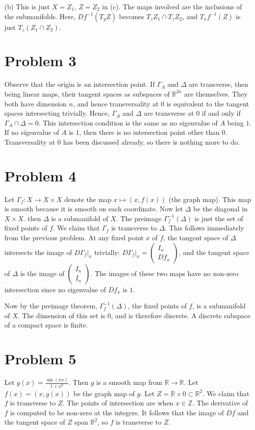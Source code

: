 \documentclass{amsart}
\numberwithin{equation}{section}
\theoremstyle{plain}
\theoremstyle{definition}
\theoremstyle{remark}
\newcommand{\Z}{\mathbb{Z}}
\renewcommand{\_}[2]{\underbrace{#1}_{#2}}
\renewcommand{\^}[2]{\overbrace{#1}_{#2}}
\newcommand{\R}{\mathbb{R}}
\begin{document}
 (b) This is just $X = Z_1$, $Z = Z_2$ in (c). The maps involved are the inclusions of the submanifolds. Here, $Df^{-1}(T_yZ)$ becomes $T_zZ_1 \cap T_zZ_2$, and $T_xf^{-1}(Z)$ is just $T_z(Z_1\cap Z_2)$. 
\section*{Problem 3}
Observe that the origin is an intersection point. If $\Gamma_A$ and $\Delta$ are transverse, then being linear maps, their tangent spaces as subspaces of $\R^{2n}$ are themselves. They both have dimension $n$, and hence transversality at $0$ is equivalent to the tangent spaces intersecting trivially. Hence, $\Gamma_A$ and $\Delta$ are transverse at $0$ if and only if $\Gamma_A \cap \Delta = 0$. This intersection condition is the same as no eigenvalue of $A$ being $1$. If no eigenvalue of $A$ is $1$, then there is no intersection point other than $0$. Transversality at $0$ has been discussed already, so there is nothing more to do.

\section*{Problem 4}
Let $\Gamma_f: X\to X\times X$ denote the map $x\mapsto (x,f(x))$ (the graph map). This map is smooth because it is smooth on each coordinate. Now let $\Delta$ be the diagonal in $X\times X$. then $\Delta$ is a submanifold of $X$. The preimage $\Gamma_f^{-1}(\Delta)$ is just the set of fixed points of $f$. We claim that $\Gamma_f$ is transverse to $\Delta$. This follows immediately from the previous problem. At any fixed point $x$ of $f$, the tangent space of $\Delta$ intersects the image of $D\Gamma_f|_x$ trivially: $D\Gamma_f|_x =
\begin{pmatrix}
  I_n\\
  Df_x
\end{pmatrix}$, and the tangent space of $\Delta$ is the image of $
\begin{pmatrix}
  I_n\\
  I_n
\end{pmatrix}$. The images of these two maps have no non-zero intersection since no eigenvalue of $Df_x$ is $1$.

Now by the preimage theorem, $\Gamma_f^{-1}(\Delta)$, the fixed points of $f$, is a submanifold of $X$. The dimension of this set is $0$, and is therefore discrete. A discrete subspace of a compact space is finite.

\section*{Problem 5}
Let $g(x) = \frac{\sin(\pi x)}{1+x^2}$. Then $g$ is a smooth map from $\R\to \R$. Let $f(x) = (x,g(x))$ be the graph map of $g$. Let $Z = \R\times 0 \subset \R^2$. We claim that $f$ is transverse to $Z$. The points of intersection are when $x \in \Z$. The derivative of $f$ is computed to be non-zero at the integers. It follows that the image of $Df$ and the tangent space of $Z$ span $\R^2$, so $f$ is transverse to $Z$.
\end{document}
